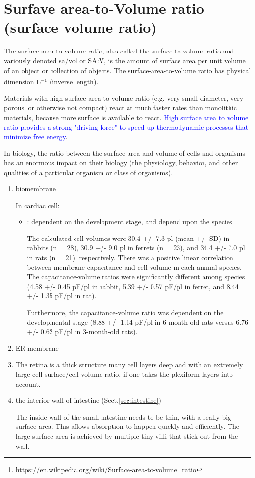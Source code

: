 \section{Surfave area-to-Volume ratio (surface volume ratio)}
\label{sec:surface-volume-ratio}

The surface-area-to-volume ratio, also called the surface-to-volume ratio and
variously denoted sa/vol or SA:V, is the amount of surface area per unit volume
of an object or collection of objects.
The surface-area-to-volume ratio has physical dimension L$^{-1}$ (inverse
length).
\footnote{\url{https://en.wikipedia.org/wiki/Surface-area-to-volume_ratio}}

Materials with high surface area to volume ratio (e.g. very small diameter, very
porous, or otherwise not compact) react at much faster rates than monolithic
materials, because more surface is available to react.
\textcolor{blue}{High surface area to volume ratio provides a strong "driving
force" to speed up thermodynamic processes that minimize free energy}.

In biology, the ratio between the surface area and volume of cells and organisms
has an enormous impact on their biology (the physiology, behavior, and other
qualities of a particular organism or class of organisms).
\begin{enumerate}
  \item biomembrane

In cardiac cell:
\begin{itemize}
  \item \citep{satoh1996svr}: dependent on the development stage, and depend
  upon the species

The calculated cell volumes were 30.4 +/- 7.3 pl (mean +/- SD) in rabbits (n =
28), 30.9 +/- 9.0 pl in ferrets (n = 23), and 34.4 +/- 7.0 pl in rats (n = 21),
respectively. There was a positive linear correlation between membrane
capacitance and cell volume in each animal species. The capacitance-volume
ratios were significantly different among species (4.58 +/- 0.45 pF/pl in
rabbit, 5.39 +/- 0.57 pF/pl in ferret, and 8.44 +/- 1.35 pF/pl in rat).

Furthermore, the capacitance-volume ratio was dependent on the developmental
stage (8.88 +/- 1.14 pF/pl in 6-month-old rats versus 6.76 +/- 0.62 pF/pl in
3-month-old rats).

\end{itemize}

  \item ER membrane

  \item The retina is a thick structure many cell layers deep and with an
  extremely large cell-surface/cell-volume ratio, if one takes the plexiform
  layers into account.

  \item the interior wall of intestine (Sect.\ref{sec:intestine})

The inside wall of the small intestine needs to be thin, with a really big
surface area. This allows absorption to happen quickly and efficiently. The
large surface area is achieved by multiple tiny villi that stick out from the
wall.

\end{enumerate}


